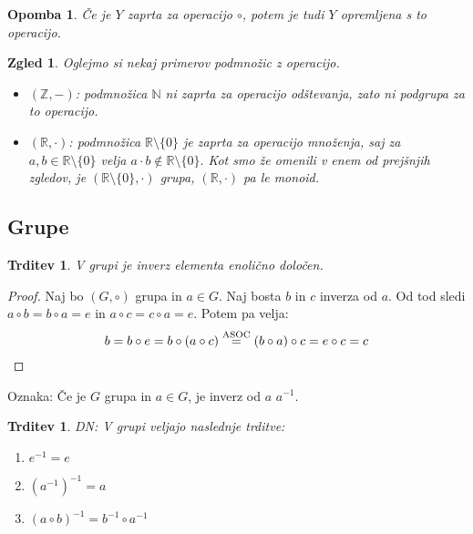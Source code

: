\documentclass[10pt, a4paper]{article}
\newtheorem{trditev}[izr]{Trditev}
\newtheorem*{opomba}{Opomba}
\newtheorem{zgled}{Zgled}[section]
\newenvironment{noticeC}{%
  \tcolorbox[%
  notitle,
  empty,
  enhanced,  %
  breakable,
  coltext=black, 
  fontupper=\rmfamily,
  parbox=false,
  noparskip,
  sharp corners,
  boxrule=-1pt,  %
  frame hidden,
  left=7pt,  %
  right=7pt,
  top=5pt,
  bottom=5pt,
  before skip=2.5ex plus 2pt,
  after skip=2.5ex plus 2pt,
  overlay unbroken and last={%
  },
  ]}
{\endtcolorbox}
\newenvironment{dokaz}%
  {\begin{noticeC}\begin{proof}}%
  {\end{proof}\end{noticeC}}
\newcommand{\N}{\mathbb {N}}
\newcommand{\Z}{\mathbb {Z}}
\newcommand{\R}{\mathbb {R}}
\begin{document}
\begin{opomba}
    Če je $Y$ zaprta za operacijo $\circ$, potem je tudi $Y$ opremljena s to operacijo.
\end{opomba}

\begin{zgled}
    Oglejmo si nekaj primerov podmnožic z operacijo.
    \begin{itemize}
        \item $(\Z, -)$: podmnožica $\N$ ni zaprta za operacijo odštevanja, zato ni podgrupa za to operacijo.
        \item $(\R, \cdot)$: podmnožica $\R \setminus \{0\}$ je zaprta za operacijo množenja, saj za $a,b \in \R \setminus \{0\}$ velja $a \cdot b \notin \R \setminus \{0\}.$ 
    Kot smo že omenili v enem od prejšnjih zgledov, je $(\R \setminus \{0\}, \cdot)$ grupa, $(\R, \cdot)$ pa le monoid.
    \end{itemize}
\end{zgled}

\subsection{Grupe}

\begin{trditev}
    V grupi je inverz elementa enolično določen.
\end{trditev}

\begin{dokaz}
    Naj bo $(G, \circ)$ grupa in $a \in G$. Naj bosta $b$ in $c$ inverza od $a$. Od tod sledi 
        $a \circ b = b \circ a = e$ in
        $a \circ c = c \circ a = e$.
    Potem pa velja:
    \begin{equation*}
        b = b \circ e
        = b \circ (a \circ c)
        \stackrel{\text{ASOC}}{=} (b \circ a) \circ c
        = e \circ c = c \qedhere
    \end{equation*}
\end{dokaz}

Oznaka: Če je $G$ grupa in $a \in G$, je inverz od $a$ $a^{-1}$.

\begin{trditev}
    DN: V grupi veljajo naslednje trditve:
    \begin{enumerate}
        \item $e^{-1} = e$
        \item $(a^{-1})^{-1} = a$
        \item $(a \circ b)^{-1} = b^{-1} \circ a^{-1}$
    \end{enumerate}
\end{trditev}
\end{document}
